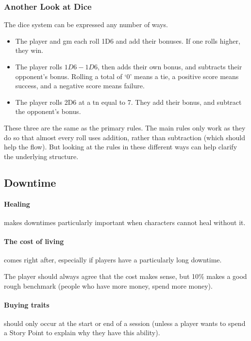 \begin{multicols}{2}
\subsubsection{Another Look at Dice}

The dice system can be expressed any number of ways.

\begin{itemize}

  \item
  The player and \gls{gm} each roll 1D6 and add their bonuses.
  If one rolls higher, they win.
  \item
  The player rolls $1D6-1D6$, then adds their own bonus, and subtracts their opponent's bonus.
  Rolling a total of `0' means a tie, a positive score means success, and a negative score means failure.
  \item
  The player rolls 2D6 at a \gls{tn} equal to 7.
  They add their bonus, and subtract the opponent's bonus.

\end{itemize}

These three are the same as the primary rules.
The main rules only work as they do so that almost every roll uses addition, rather than subtraction (which should help the flow).
But looking at the rules in these different ways can help clarify the underlying structure.

\subsection{Downtime}

\paragraph{Healing}
makes downtimes particularly important when characters cannot heal without it.

\paragraph{The cost of living}
comes right after, especially if players have a particularly long downtime.

The player should always agree that the cost makes sense, but 10\% makes a good rough benchmark (people who have more money, spend more money).

\paragraph{Buying traits}
should only occur at the start or end of a session (unless a player wants to spend a Story Point to explain why they have this ability).


\end{multicols}
